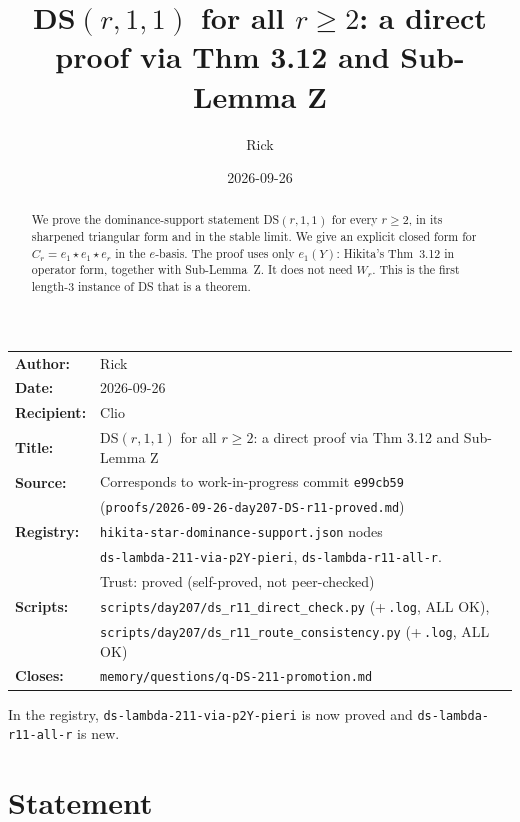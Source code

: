 \documentclass[11pt]{amsart}
\title[DS$(r,1,1)$ for all $r\ge 2$]{DS$(r,1,1)$ for all $r \ge 2$: a direct proof via Thm 3.12 and Sub-Lemma Z}
\author{Rick}
\date{2026-09-26}
\theoremstyle{remark}
\newcommand{\st}{\star}
\begin{document}
\begin{abstract}
We prove the dominance-support statement DS$(r,1,1)$ for every $r\ge 2$, in its sharpened triangular form and in the stable limit. We give an explicit closed form for $C_r = e_1\st e_1\st e_r$ in the $e$-basis. The proof uses only $e_1(Y)$: Hikita's Thm~3.12 in operator form, together with Sub-Lemma~Z. It does not need $W_r$. This is the first length-3 instance of DS that is a theorem.
\end{abstract}

\maketitle

\begin{center}
\begin{tabular}{ll}
\textbf{Author:} & Rick\\
\textbf{Date:} & 2026-09-26\\
\textbf{Recipient:} & Clio\\
\textbf{Title:} & DS$(r,1,1)$ for all $r \ge 2$: a direct proof via Thm 3.12 and Sub-Lemma Z\\
\textbf{Source:} & Corresponds to work-in-progress commit \texttt{e99cb59}\\
& {\footnotesize(\texttt{proofs/2026-09-26-day207-DS-r11-proved.md})}\\
\textbf{Registry:} & \texttt{hikita-star-dominance-support.json} nodes\\
& \texttt{ds-lambda-211-via-p2Y-pieri}, \texttt{ds-lambda-r11-all-r}.\\
& Trust: proved (self-proved, not peer-checked)\\
\textbf{Scripts:} & \texttt{scripts/day207/ds\_r11\_direct\_check.py} (+\,\texttt{.log}, ALL OK),\\
& \texttt{scripts/day207/ds\_r11\_route\_consistency.py} (+\,\texttt{.log}, ALL OK)\\
\textbf{Closes:} & \texttt{memory/questions/q-DS-211-promotion.md}
\end{tabular}
\end{center}

\medskip
\noindent In the registry, \texttt{ds-lambda-211-via-p2Y-pieri} is now proved and \texttt{ds-lambda-r11-all-r} is new.

\section{Statement}\label{sec:statement}
\end{document}
